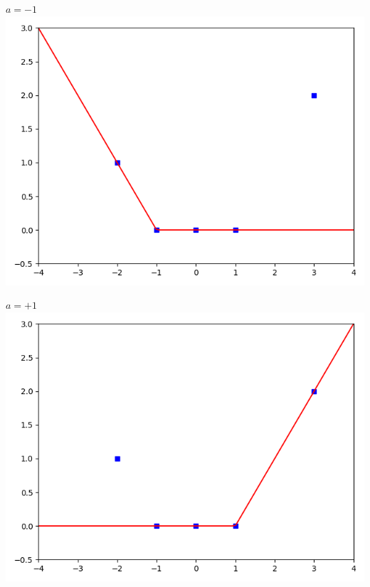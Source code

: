 \begin{center}
	\begin{minipage}{0.45\textwidth}
		\center \textbf{$a=-1$}
		\includegraphics[scale=\myscale,scale=0.45]{figures/retro_04_b}
	\end{minipage}
	\begin{minipage}{0.45\textwidth}
		\center \textbf{$a=+1$}
		\includegraphics[scale=\myscale,scale=0.45]{figures/retro_04_c}
	\end{minipage}
\end{center}

